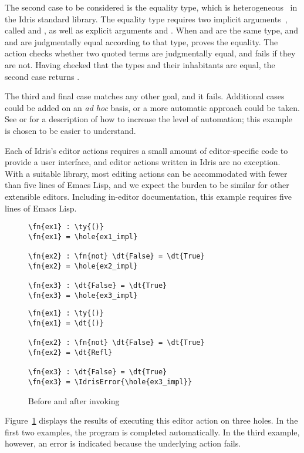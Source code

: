 The second case to be considered is the equality type, which is
heterogeneous~\citep{mcbridephd} in the Idris standard library.  The
equality type requires two implicit arguments~\citep{pollack}, called
 and , as well as explicit arguments  and .
When  and  are the same type, and  and  are
judgmentally equal according to that type,  proves the
equality. The  action checks whether two quoted terms are
judgmentally equal, and fails if they are not. Having checked that the
types and their inhabitants are equal, the second case returns .

The third and final case matches any other goal, and it
fails. Additional cases could be added on an \emph{ad hoc} basis, or a
more automatic approach could be taken. See \citet{davidphd} or
\citet{elabref} for a description of how to increase the level of
automation; this example is chosen to be easier to understand.

Each of Idris's editor actions requires a small amount of
editor-specific code to provide a user interface, and editor actions
written in Idris are no exception. With a suitable library, most
editing actions can be accommodated with fewer than five lines of
Emacs Lisp, and we expect the burden to be similar for other
extensible editors. Including in-editor documentation, this example
requires five lines of Emacs Lisp.

\begin{figure}[h]
\begin{BVerbatim}
\fn{ex1} : \ty{()}
\fn{ex1} = \hole{ex1_impl}

\fn{ex2} : \fn{not} \dt{False} = \dt{True}
\fn{ex2} = \hole{ex2_impl}

\fn{ex3} : \dt{False} = \dt{True}
\fn{ex3} = \hole{ex3_impl}
\end{BVerbatim}
\hspace{1em}
\begin{BVerbatim}
\fn{ex1} : \ty{()}
\fn{ex1} = \dt{()}

\fn{ex2} : \fn{not} \dt{False} = \dt{True}
\fn{ex2} = \dt{Refl}

\fn{ex3} : \dt{False} = \dt{True}
\fn{ex3} = \IdrisError{\hole{ex3_impl}}
\end{BVerbatim}

  \caption{Before and after invoking }
  \label{fig:motivating-example-exec}
\end{figure}

Figure~\ref{fig:motivating-example-exec} displays the results of
executing this editor action on three holes. In the first two
examples, the program is completed automatically. In the third
example, however, an error is indicated because the underlying
 action fails.

